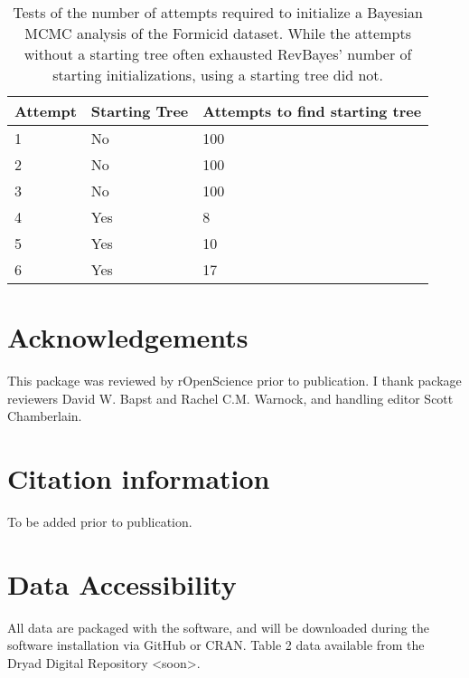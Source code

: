 \documentclass[11pt]{article}
\begin{document}
\begin{table}[]
\centering
\begin{tabular}{|l|l|l|}
\hline
\multicolumn{1}{|c|}{Attempt} & Starting Tree & Attempts to find starting tree \\ \hline
1 & No & 100 \\ \hline
2 & No & 100 \\ \hline
3 & No & 100 \\ \hline
4 & Yes & 8 \\ \hline
5 & Yes & 10 \\ \hline
6 & Yes & 17 \\ \hline
\end{tabular}
\caption{Tests of the number of attempts required to initialize a Bayesian MCMC analysis of the Formicid dataset. While the attempts without a starting tree often exhausted RevBayes' number of starting initializations, using a starting tree did not.}
\end{table}


\section{Acknowledgements}

This package was reviewed by rOpenScience prior to publication. I thank package reviewers David W. Bapst and Rachel C.M. Warnock, and handling editor Scott Chamberlain.


\section{Citation information}

To be added prior to publication.
 
\section{Data Accessibility}

All data are packaged with the software, and will be downloaded during the software installation via GitHub or CRAN. 
Table 2 data available from the Dryad Digital Repository <soon>. 



\end{document}
